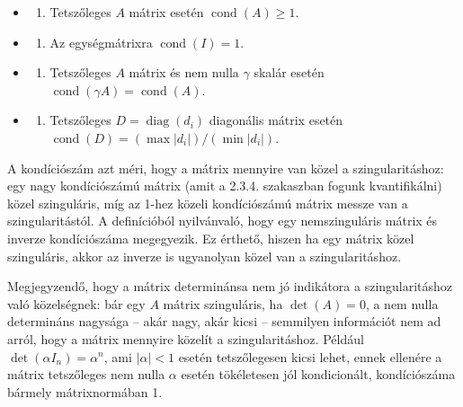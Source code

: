 \documentclass[
  magyar,
  11pt]{article}
\providecommand{\tightlist}{%
  \setlength{\itemsep}{0pt}\setlength{\parskip}{0pt}}
\begin{document}
\begin{itemize}
\tightlist
\item
  \begin{enumerate}
  \def\labelenumi{\arabic{enumi}.}
  \tightlist
  \item
    Tetszőleges \(A\) mátrix esetén \(\operatorname{cond}(A) \ge 1\).
  \end{enumerate}
\item
  \begin{enumerate}
  \def\labelenumi{\arabic{enumi}.}
  \setcounter{enumi}{1}
  \tightlist
  \item
    Az egységmátrixra \(\operatorname{cond}(I) = 1\).
  \end{enumerate}
\item
  \begin{enumerate}
  \def\labelenumi{\arabic{enumi}.}
  \setcounter{enumi}{2}
  \tightlist
  \item
    Tetszőleges \(A\) mátrix és nem nulla \(\gamma\) skalár esetén
    \(\operatorname{cond}(\gamma A) = \operatorname{cond}(A)\).
  \end{enumerate}
\item
  \begin{enumerate}
  \def\labelenumi{\arabic{enumi}.}
  \setcounter{enumi}{3}
  \tightlist
  \item
    Tetszőleges \(D = \operatorname{diag}(d_i)\) diagonális mátrix
    esetén \(\operatorname{cond}(D) = (\max |d_i|)/(\min |d_i|)\).
  \end{enumerate}
\end{itemize}

A kondíciószám azt méri, hogy a mátrix mennyire van közel a
szingularitáshoz: egy nagy kondíciószámú mátrix (amit a 2.3.4.
szakaszban fogunk kvantifikálni) közel szinguláris, míg az 1-hez közeli
kondíciószámú mátrix messze van a szingularitástól. A definícióból
nyilvánvaló, hogy egy nemszinguláris mátrix és inverze kondíciószáma
megegyezik. Ez érthető, hiszen ha egy mátrix közel szinguláris, akkor az
inverze is ugyanolyan közel van a szingularitáshoz.

Megjegyzendő, hogy a mátrix determinánsa nem jó indikátora a
szingularitáshoz való közelségnek: bár egy \(A\) mátrix szinguláris, ha
\(\det(A) = 0\), a nem nulla determináns nagysága -- akár nagy, akár
kicsi -- semmilyen információt nem ad arról, hogy a mátrix mennyire
közelít a szingularitáshoz. Például \(\det(\alpha I_n) = \alpha^n\), ami
\(|\alpha| < 1\) esetén tetszőlegesen kicsi lehet, ennek ellenére a
mátrix tetszőleges nem nulla \(\alpha\) esetén tökéletesen jól
kondicionált, kondíciószáma bármely mátrixnormában 1.
\end{document}
